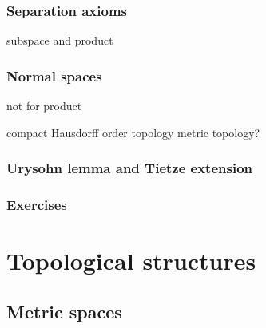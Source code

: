 \documentclass{../../large}
\begin{document}
\section{Separation axioms}
subspace and product


\section{Normal spaces}
not for product

compact Hausdorff
order topology
metric topology?

\section{Urysohn lemma and Tietze extension}



\section*{Exercises}
\begin{prb}
\end{prb}
\begin{prb}
\end{prb}
\begin{prb}
\end{prb}
\begin{prb}
\end{prb}
\begin{prb}
\end{prb}



\part{Topological structures}

\chapter{Metric spaces}
\end{document}
